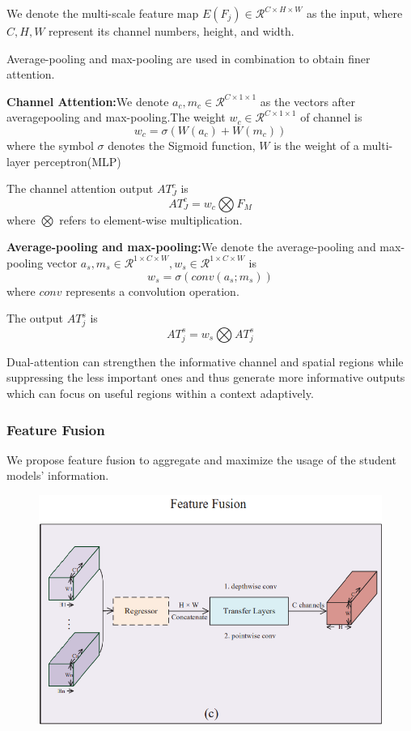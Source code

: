 \documentclass[11pt]{article}
\begin{document}
We denote the multi-scale feature map $E(F_j)\in \mathcal{R}^{C\times H\times W}$ as the input, where $C,H,W$ represent its channel numbers, height, and width.

Average-pooling and max-pooling are used in combination to obtain finer attention.

\textbf{Channel Attention:}We denote $a_c,m_c \in \mathcal{R}^{C\times 1\times1}$ as the vectors after averagepooling and max-pooling.The weight $w_c \in \mathcal{R}^{C\times 1\times 1}$ of channel is
$$w_c = \sigma(W(a_c) + W(m_c))$$
where the symbol $\sigma$ denotes the Sigmoid function, $W$ is the weight of a multi-layer perceptron(MLP)

The channel attention output $AT_J^c$ is
$$AT_J^c = w_c \bigotimes F_M$$
where $\bigotimes$ refers to element-wise multiplication.

\textbf{Average-pooling and max-pooling:}We denote the average-pooling and max-pooling vector $a_s,m_s \in \mathcal{R}^{1\times C\times W}, w_s\in \mathcal{R}^{1\times C\times W}$ is
$$w_s = \sigma(conv(a_s;m_s))$$
where $conv$ represents a convolution operation.

The output $AT_j^s$ is
$$AT_j^s = w_s\bigotimes AT_j^s$$

Dual-attention can strengthen the informative channel and spatial regions while
suppressing the less important ones and thus generate more informative outputs
which can focus on useful regions within a context adaptively.

\subsubsection{Feature Fusion}
We propose feature fusion to aggregate and maximize the usage of the student models’ information.
\begin{figure}[H]
	\centering
	\includegraphics[scale = 0.5]{107}
\end{figure}
\end{document}
